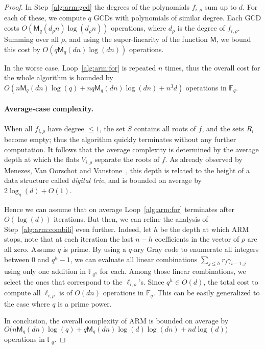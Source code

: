 \documentclass{article}
\newcommand{\ff}[1]{\mathbb{F}_{#1}}
\newcommand{\qq}{q}
\newcommand{\nn}{n}
\newcommand{\qn}{{\qq^\nn}}
\newcommand{\basef}{\ff{\qq}}
\newcommand{\extf}{\ff{\qn}}
\newcommand{\Mul}{\mathsf{M}}
\newcounter{algo}
\begin{document}
\begin{proof}
  In Step~\ref{alg:arm:gcd} the degrees of the polynomials
  $f_{i,\rho}$ sum up to $d$. %
  For each of these, we compute $q$ GCDs with polynomials of similar
  degree. %
  Each GCD costs $O(\Mul_q(d_\rho n)\log(d_\rho n))$ operations, where
  $d_\rho$ is the degree of $f_{i,\rho}$. %
  Summing over all $\rho$, and using the super-linearity of the
  function $\Mul$, we bound this cost by $O(q\Mul_q(dn)\log(dn))$
  operations.

  In the worse case, Loop~\ref{alg:arm:for} is repeated $n$ times,
  thus the overall cost for the whole algorithm is bounded by
  $O(n\Mul_q(dn)\log(q) + nq\Mul_q(dn)\log(dn) + n^3d)$ operations in
  $\basef$.

  \paragraph{Average-case complexity.} When all $f_{i,\rho}$ have
  degree $\le 1$, the set $S$ contains all roots of $f$, and the sets
  $R_i$ become empty; thus the algorithm quickly terminates without
  any further computation. %
  It follows that the average complexity is determined by the average
  depth at which the flats $V_{i,\rho}$ separate the roots of $f$. %
  As already observed by Menezes, Van Oorschot and
  Vanstone~\cite[Theorem~7]{Menvanovans92}, this depth is related to
  the height of a data structure called \emph{digital trie}, and is
  bounded on average by $2\log_q(d) + O(1)$.

  Hence we can assume that on average Loop~\ref{alg:arm:for}
  terminates after $O(\log(d))$ iterations. %
  But then, we can refine the analysis of Step~\ref{alg:arm:combili}
  even further. %
  Indeed, let $h$ be the depth at which ARM stops, note that at each
  iteration the last $n-h$ coefficients in the vector of $\rho$
  are all zero. %
  Assume $q$ is prime. By using a $q$-ary Gray code to enumerate all
  integers between $0$ and $q^h-1$, we can evaluate all linear
  combinations $\sum_{j\le h} r_j\gamma_{i-1,j}$ using only one
  addition in $\extf$ for each. %
  Among those linear combinations, we select the ones that correspond
  to the $\ell_{i,\rho}$'s. %
  Since $q^h\in O(d)$, the total cost to compute all $\ell_{i,\rho}$
  is of $O(dn)$ operations in $\basef$. %
  This can be easily generalized to the case where $q$ is a prime
  power.

  In conclusion, the overall complexity of ARM is bounded on average
  by
  $O\bigl(n\Mul_q(dn)\log(q) + q\Mul_q(dn)\log(d)\log(dn) +
  nd\log(d)\bigr)$ operations in $\basef$.
\end{proof}
\end{document}

